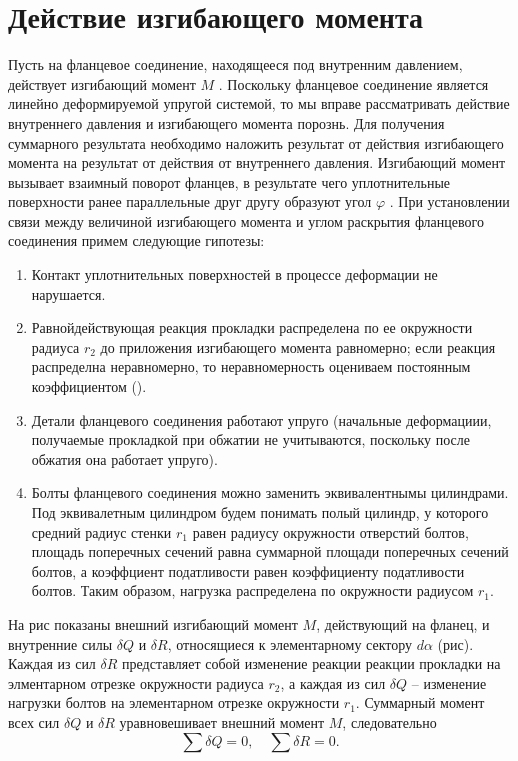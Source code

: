 \section{Действие изгибающего момента}
\label{BendingMoment}

Пусть на фланцевое соединение, находящееся под внутренним давлением, действует изгибающий момент $M$ . 
Поскольку фланцевое соединение является линейно деформируемой упругой системой, то мы вправе рассматривать действие внутреннего давления и изгибающего момента порознь.
Для получения суммарного результата необходимо наложить результат от действия изгибающего момента на результат от действия от внутреннего давления.
Изгибающий момент вызывает взаимный поворот фланцев, в результате чего уплотнительные поверхности ранее параллельные друг другу образуют угол $\varphi$ .
При установлении связи между величиной изгибающего момента и углом раскрытия фланцевого соединения примем следующие гипотезы:
\begin{enumerate}
  \item Контакт уплотнительных поверхностей в процессе деформации не нарушается.
  \item Равнойдействующая реакция прокладки распределена по ее окружности радиуса $r_2$ до приложения изгибающего момента равномерно; если реакция распределна неравномерно, то неравномерность оцениваем постоянным коэффициентом ().
  \item Детали фланцевого соединения работают упруго (начальные деформациии, получаемые прокладкой при обжатии не учитываются, поскольку после обжатия она работает упруго).
  \item Болты фланцевого соединения можно заменить эквивалентнымы цилиндрами. Под эквивалетным цилиндром будем понимать полый цилиндр, у которого средний радиус стенки $r_1$ равен радиусу окружности отверстий болтов, площадь поперечных сечений равна суммарной площади поперечных сечений болтов, а коэффциент податливости равен коэффициенту податливости болтов. Таким образом, нагрузка распределена по окружности радиусом $r_1$.
  \end{enumerate}



На рис показаны внешний изгибающий момент $M$, действующий на фланец, и внутренние силы $\delta Q$ и $\delta R$, относящиеся к элементарному сектору $d \alpha$ (рис).
Каждая из сил $\delta R$ представляет собой изменение реакции реакции прокладки на элментарном отрезке окружности радиуса $r_2$, а каждая из сил $\delta Q$ -- изменение нагрузки болтов на элементарном отрезке окружности $r_1$.
Суммарный момент всех сил $\delta Q$ и $\delta R$ уравновешивает внешний момент $M$, следовательно 
\begin{equation}
  \label{BendingMoment_eq1}
    \sum \delta Q=0, \quad \sum \delta R=0.
\end{equation}

